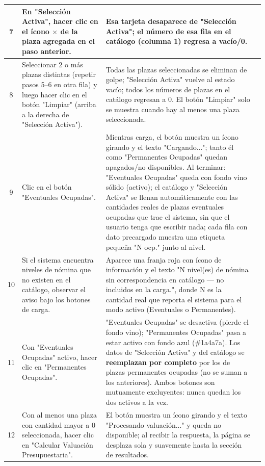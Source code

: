\documentclass[11pt]{article}
\newcommand{\chk}[1]{\CheckBox[name=#1,width=11pt,height=11pt,bordercolor=grisborde,backgroundcolor=1 1 1]{}}
\begin{document}
\begin{Form}
\begin{longtable}{|c|p{6.7cm}|p{6.7cm}|c|}
7 &
En "Selección Activa", hacer clic en el ícono $\times$ de la plaza agregada en el paso anterior. &
Esa tarjeta desaparece de "Selección Activa"; el número de esa fila en el catálogo (columna 1)
regresa a vacío/0. &
\chk{t1r7} \\ \hline

8 &
Seleccionar 2 o más plazas distintas (repetir pasos 5--6 en otra fila) y luego hacer clic en el
botón "Limpiar" (arriba a la derecha de "Selección Activa"). &
Todas las plazas seleccionadas se eliminan de golpe; "Selección Activa" vuelve al estado vacío;
todos los números de plazas en el catálogo regresan a 0. El botón "Limpiar" solo se muestra cuando
hay al menos una plaza seleccionada. &
\chk{t1r8} \\ \hline

9 &
Clic en el botón "Eventuales Ocupadas". &
Mientras carga, el botón muestra un ícono girando y el texto "Cargando..."; tanto él como
"Permanentes Ocupadas" quedan apagados/no disponibles. Al terminar: "Eventuales Ocupadas" queda con
fondo vino sólido (activo); el catálogo y "Selección Activa" se llenan automáticamente con las
cantidades reales de plazas eventuales ocupadas que trae el sistema, sin que el usuario tenga que
escribir nada; cada fila con dato precargado muestra una etiqueta pequeña "N ocp." junto al nivel. &
\chk{t1r9} \\ \hline

10 &
Si el sistema encuentra niveles de nómina que no existen en el catálogo, observar el aviso bajo
los botones de carga. &
Aparece una franja roja con ícono de información y el texto "N nivel(es) de nómina sin
correspondencia en catálogo --- no incluidos en la carga.", donde N es la cantidad real que reporta
el sistema para el modo activo (Eventuales o Permanentes). &
\chk{t1r10} \\ \hline

11 &
Con "Eventuales Ocupadas" activo, hacer clic en "Permanentes Ocupadas". &
"Eventuales Ocupadas" se desactiva (pierde el fondo vino); "Permanentes Ocupadas" pasa a estar
activo con fondo azul (\#1a4a7a). Los datos de "Selección Activa" y del catálogo se
\textbf{reemplazan por completo} por los de plazas permanentes ocupadas (no se suman a los
anteriores). Ambos botones son mutuamente excluyentes: nunca quedan los dos activos a la vez. &
\chk{t1r11} \\ \hline

12 &
Con al menos una plaza con cantidad mayor a 0 seleccionada, hacer clic en "Calcular Valuación
Presupuestaria". &
El botón muestra un ícono girando y el texto "Procesando valuación..." y queda no disponible; al
recibir la respuesta, la página se desplaza sola y suavemente hasta la sección de resultados. &
\chk{t1r12} \\ \hline


\end{longtable}
\end{Form}
\end{document}
